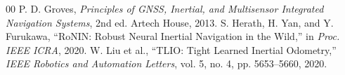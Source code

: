\documentclass[conference]{IEEEtran}
\begin{document}
\begin{thebibliography}{00}
 P. D. Groves, \textit{Principles of GNSS, Inertial, and Multisensor Integrated Navigation Systems}, 2nd ed. Artech House, 2013.
 S. Herath, H. Yan, and Y. Furukawa, ``RoNIN: Robust Neural Inertial Navigation in the Wild,'' in \textit{Proc. IEEE ICRA}, 2020.
 W. Liu et al., ``TLIO: Tight Learned Inertial Odometry,'' \textit{IEEE Robotics and Automation Letters}, vol. 5, no. 4, pp. 5653--5660, 2020.
\end{thebibliography}
\end{document}
